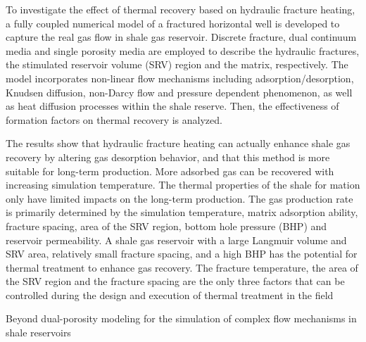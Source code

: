 \documentclass{article}
\begin{document}
To investigate the effect of thermal recovery based on hydraulic fracture heating, a fully coupled numerical model of a fractured horizontal well is developed to capture the real gas flow in shale gas reservoir. Discrete fracture, dual continuum media and single porosity media are employed to describe the hydraulic fractures, the stimulated reservoir volume (SRV) region and the matrix, respectively. The model incorporates non-linear flow mechanisms including adsorption/desorption, Knudsen diffusion, non-Darcy flow and pressure dependent phenomenon, as well as heat diffusion processes within the shale reserve. Then, the effectiveness of formation factors on thermal recovery is analyzed. 

The results show that hydraulic fracture heating can actually enhance shale gas recovery by altering gas desorption behavior, and that this method is more suitable for long-term production. More adsorbed gas can be recovered with increasing simulation temperature. The thermal properties of the shale for mation only have limited impacts on the long-term production. The gas production rate is primarily determined by the simulation temperature, matrix adsorption ability, fracture spacing, area of the SRV region, bottom hole pressure (BHP) and reservoir permeability. A shale gas reservoir with a large Langmuir volume and SRV area, relatively small fracture spacing, and a high BHP has the potential for thermal treatment to enhance gas recovery. The fracture temperature, the area of the SRV region and the fracture spacing are the only three factors that can be controlled during the design and execution of thermal treatment in the field

Beyond dual-porosity modeling for the simulation of complex flow mechanisms in shale reservoirs
\end{document}
